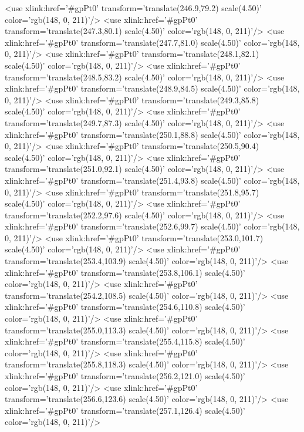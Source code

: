 	<use xlink:href='#gpPt0' transform='translate(246.9,79.2) scale(4.50)' color='rgb(148,   0, 211)'/>
	<use xlink:href='#gpPt0' transform='translate(247.3,80.1) scale(4.50)' color='rgb(148,   0, 211)'/>
	<use xlink:href='#gpPt0' transform='translate(247.7,81.0) scale(4.50)' color='rgb(148,   0, 211)'/>
	<use xlink:href='#gpPt0' transform='translate(248.1,82.1) scale(4.50)' color='rgb(148,   0, 211)'/>
	<use xlink:href='#gpPt0' transform='translate(248.5,83.2) scale(4.50)' color='rgb(148,   0, 211)'/>
	<use xlink:href='#gpPt0' transform='translate(248.9,84.5) scale(4.50)' color='rgb(148,   0, 211)'/>
	<use xlink:href='#gpPt0' transform='translate(249.3,85.8) scale(4.50)' color='rgb(148,   0, 211)'/>
	<use xlink:href='#gpPt0' transform='translate(249.7,87.3) scale(4.50)' color='rgb(148,   0, 211)'/>
	<use xlink:href='#gpPt0' transform='translate(250.1,88.8) scale(4.50)' color='rgb(148,   0, 211)'/>
	<use xlink:href='#gpPt0' transform='translate(250.5,90.4) scale(4.50)' color='rgb(148,   0, 211)'/>
	<use xlink:href='#gpPt0' transform='translate(251.0,92.1) scale(4.50)' color='rgb(148,   0, 211)'/>
	<use xlink:href='#gpPt0' transform='translate(251.4,93.8) scale(4.50)' color='rgb(148,   0, 211)'/>
	<use xlink:href='#gpPt0' transform='translate(251.8,95.7) scale(4.50)' color='rgb(148,   0, 211)'/>
	<use xlink:href='#gpPt0' transform='translate(252.2,97.6) scale(4.50)' color='rgb(148,   0, 211)'/>
	<use xlink:href='#gpPt0' transform='translate(252.6,99.7) scale(4.50)' color='rgb(148,   0, 211)'/>
	<use xlink:href='#gpPt0' transform='translate(253.0,101.7) scale(4.50)' color='rgb(148,   0, 211)'/>
	<use xlink:href='#gpPt0' transform='translate(253.4,103.9) scale(4.50)' color='rgb(148,   0, 211)'/>
	<use xlink:href='#gpPt0' transform='translate(253.8,106.1) scale(4.50)' color='rgb(148,   0, 211)'/>
	<use xlink:href='#gpPt0' transform='translate(254.2,108.5) scale(4.50)' color='rgb(148,   0, 211)'/>
	<use xlink:href='#gpPt0' transform='translate(254.6,110.8) scale(4.50)' color='rgb(148,   0, 211)'/>
	<use xlink:href='#gpPt0' transform='translate(255.0,113.3) scale(4.50)' color='rgb(148,   0, 211)'/>
	<use xlink:href='#gpPt0' transform='translate(255.4,115.8) scale(4.50)' color='rgb(148,   0, 211)'/>
	<use xlink:href='#gpPt0' transform='translate(255.8,118.3) scale(4.50)' color='rgb(148,   0, 211)'/>
	<use xlink:href='#gpPt0' transform='translate(256.2,121.0) scale(4.50)' color='rgb(148,   0, 211)'/>
	<use xlink:href='#gpPt0' transform='translate(256.6,123.6) scale(4.50)' color='rgb(148,   0, 211)'/>
	<use xlink:href='#gpPt0' transform='translate(257.1,126.4) scale(4.50)' color='rgb(148,   0, 211)'/>
